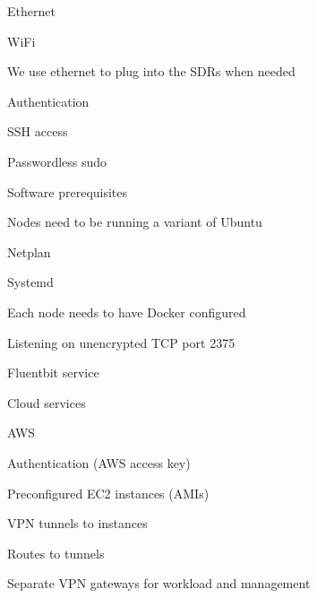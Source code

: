\begin{outline}
\begin{outline}
\begin{outline}
\begin{outline}
                \begin{outline}
                    \item Ethernet
                    \item WiFi
                    \item We use ethernet to plug into the SDRs when needed
                \end{outline}
                \item Authentication
                \begin{outline}
                    \item SSH access
                    \item Passwordless sudo
                \end{outline}
                \item Software prerequisites
                \begin{outline}
                    \item Nodes need to be running a variant of Ubuntu
                    \begin{outline}
                        \item Netplan
                        \item Systemd
                    \end{outline}
                    \item Each node needs to have Docker configured
                    \begin{outline}
                        \item Listening on unencrypted TCP port 2375
                    \end{outline}
                \end{outline}
                \item Fluentbit service
                \item Cloud services
                \begin{outline}
                    \item AWS
                    \item Authentication (AWS access key)
                    \item Preconfigured EC2 instances (AMIs)
                    \item VPN tunnels to instances
                    \item Routes to tunnels
                    \item Separate VPN gateways for workload and management
                \end{outline}

\end{outline}
\end{outline}
\end{outline}
\end{outline}
